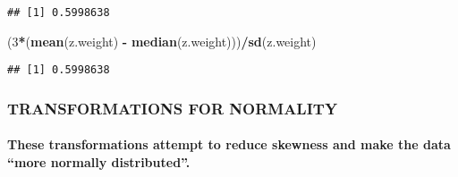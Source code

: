 \documentclass[11pt,]{article}
\newenvironment{Shaded}{\begin{snugshade}}{\end{snugshade}}
\newcommand{\DecValTok}[1]{\textcolor[rgb]{0.00,0.00,0.81}{#1}}
\newcommand{\KeywordTok}[1]{\textcolor[rgb]{0.13,0.29,0.53}{\textbf{#1}}}
\newcommand{\NormalTok}[1]{#1}
\newcommand{\OperatorTok}[1]{\textcolor[rgb]{0.81,0.36,0.00}{\textbf{#1}}}
\newcommand{\StringTok}[1]{\textcolor[rgb]{0.31,0.60,0.02}{#1}}
\let\oldparagraph\paragraph
\renewcommand{\paragraph}[1]{\oldparagraph{#1}\mbox{}}
\begin{document}
\begin{Shaded}
\end{Shaded}

\begin{verbatim}
## [1] 0.5998638
\end{verbatim}

\begin{Shaded}
\begin{Highlighting}[]
\NormalTok{  (}\DecValTok{3}\OperatorTok{*}\NormalTok{(}\KeywordTok{mean}\NormalTok{(z.weight) }\OperatorTok{-}\StringTok{ }\KeywordTok{median}\NormalTok{(z.weight)))}\OperatorTok{/}\KeywordTok{sd}\NormalTok{(z.weight)}
\end{Highlighting}
\end{Shaded}

\begin{verbatim}
## [1] 0.5998638
\end{verbatim}

\hypertarget{transformations-for-normality}{%
\subsubsection{TRANSFORMATIONS FOR
NORMALITY}\label{transformations-for-normality}}

\hypertarget{these-transformations-attempt-to-reduce-skewness-and-make-the-data-more-normally-distributed.}{%
\paragraph{These transformations attempt to reduce skewness and make the
data ``more normally
distributed''.}\label{these-transformations-attempt-to-reduce-skewness-and-make-the-data-more-normally-distributed.}}
\end{document}
